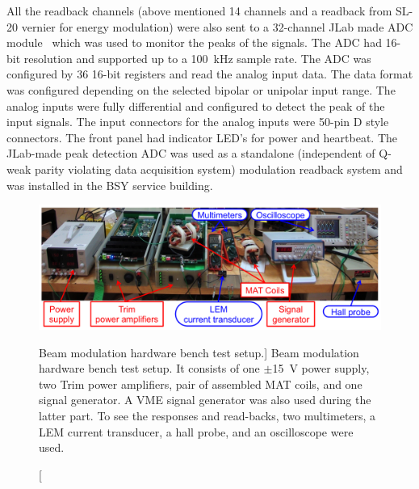 All the readback channels (above mentioned 14 channels and a readback from SL-20 vernier for energy modulation) were also sent to a 32-channel JLab made ADC module~\cite{JLab_ADC} which was used to monitor the peaks of the signals.
The ADC had 16-bit resolution and supported up to a 100~kHz sample rate. The ADC was configured by 36 16-bit registers and read the analog input data. The data format was configured depending on the selected bipolar or unipolar input range. The analog inputs were fully differential and configured to detect the peak of the input signals. The input connectors for the analog inputs were 50-pin D style connectors. The front panel had indicator LED's for power and heartbeat. 
The JLab-made peak detection ADC was used as a standalone (independent of Q-weak parity violating data acquisition system) modulation readback system and was installed in the BSY service building.

\begin{singlespace}
\begin{figure}[!h]
	\begin{center}
	\includegraphics[width=15.0cm]{figures/BModTestHardware}
	\end{center}
	\caption
	[Beam modulation hardware bench test setup.]
	{Beam modulation hardware bench test setup. It consists of one $\pm$15~V power supply, two Trim power amplifiers, pair of assembled MAT coils, and one signal generator. A VME signal generator was also used during the latter part. To see the responses and read-backs, two multimeters, a LEM current transducer, a hall probe, and an oscilloscope were used. }
	\label{fig:BModTestHardware}
\end{figure}
\end{singlespace}

